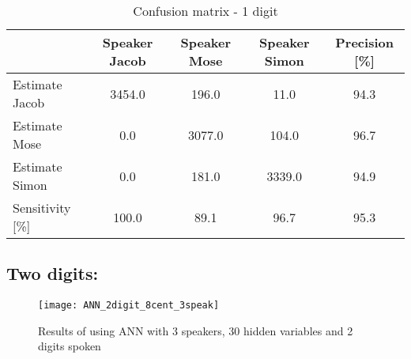 \begin{table}[H]                                                    
\centering                                                          
\begin{tabular}{|l|c|c|c|c|}                                        
\hline                                                              
  & Speaker Jacob & Speaker Mose & Speaker Simon & Precision [\%] \\
\hline                                                              
Estimate Jacob & 3454.0 & 196.0 & 11.0 & 94.3 \\                    
\hline                                                              
Estimate Mose & 0.0 & 3077.0 & 104.0 & 96.7 \\                      
\hline                                                              
Estimate Simon & 0.0 & 181.0 & 3339.0 & 94.9 \\                     
\hline                                                              
Sensitivity [\%] & 100.0 & 89.1 & 96.7 & 95.3 \\                    
\hline                                                              
\end{tabular}                                                       
\caption{Confusion matrix - 1 digit}                                
\label{table:ANN_conf_1}                                            
\end{table}  



\subsection{Two digits:}
\begin{figure}[H]
\centering
\texttt{[image: ANN\_2digit\_8cent\_3speak]}
\caption{Results of using ANN with 3 speakers, 30 hidden variables and 2 digits spoken}
\label{fig:ANN_fig_2}
\end{figure}

